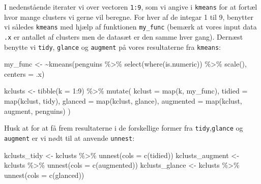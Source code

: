 \documentclass[
]{book}
\newenvironment{Shaded}{\begin{snugshade}}{\end{snugshade}}
\newcommand{\AttributeTok}[1]{\textcolor[rgb]{0.77,0.63,0.00}{#1}}
\newcommand{\DecValTok}[1]{\textcolor[rgb]{0.00,0.00,0.81}{#1}}
\newcommand{\ErrorTok}[1]{\textcolor[rgb]{0.64,0.00,0.00}{\textbf{#1}}}
\newcommand{\FunctionTok}[1]{\textcolor[rgb]{0.00,0.00,0.00}{#1}}
\newcommand{\NormalTok}[1]{#1}
\newcommand{\OtherTok}[1]{\textcolor[rgb]{0.56,0.35,0.01}{#1}}
\newcommand{\SpecialCharTok}[1]{\textcolor[rgb]{0.00,0.00,0.00}{#1}}
\begin{document}
I nedenstående iterater vi over vectoren \texttt{1:9}, som vi angive i \texttt{kmeans} for at fortæl hvor mange clusters vi gerne vil beregne. For hver af de integar 1 til 9, benytter vi således \texttt{kmeans} med hjælp af funktionen \texttt{my\_func} (bemærk at vores input data \texttt{.x} er antallet af clusters men de datasæt er den samme hver gang). Dernæst benytte vi \texttt{tidy}, \texttt{glance} og \texttt{augment} på vores resultaterne fra \texttt{kmeans}:

\begin{Shaded}
\begin{Highlighting}[]
\NormalTok{my\_func }\OtherTok{\textless{}{-}} \ErrorTok{\textasciitilde{}}\FunctionTok{kmeans}\NormalTok{(penguins }\SpecialCharTok{\%\textgreater{}\%} \FunctionTok{select}\NormalTok{(}\FunctionTok{where}\NormalTok{(is.numeric)) }\SpecialCharTok{\%\textgreater{}\%} \FunctionTok{scale}\NormalTok{(),}
                 \AttributeTok{centers =}\NormalTok{ .x)  }

\NormalTok{kclusts }\OtherTok{\textless{}{-}} 
  \FunctionTok{tibble}\NormalTok{(}\AttributeTok{k =} \DecValTok{1}\SpecialCharTok{:}\DecValTok{9}\NormalTok{) }\SpecialCharTok{\%\textgreater{}\%}
  \FunctionTok{mutate}\NormalTok{( }\AttributeTok{kclust =} \FunctionTok{map}\NormalTok{(k, my\_func),}
          \AttributeTok{tidied =} \FunctionTok{map}\NormalTok{(kclust, tidy),}
          \AttributeTok{glanced =} \FunctionTok{map}\NormalTok{(kclust, glance),}
          \AttributeTok{augmented =} \FunctionTok{map}\NormalTok{(kclust, augment, penguins)}
\NormalTok{        )}
\end{Highlighting}
\end{Shaded}

Husk at for at få frem resultaterne i de forskellige former fra \texttt{tidy},\texttt{glance} og \texttt{augment} er vi nødt til at anvende \texttt{unnest}:

\begin{Shaded}
\begin{Highlighting}[]
\NormalTok{kclusts\_tidy    }\OtherTok{\textless{}{-}}\NormalTok{ kclusts }\SpecialCharTok{\%\textgreater{}\%} \FunctionTok{unnest}\NormalTok{(}\AttributeTok{cols =} \FunctionTok{c}\NormalTok{(tidied))}
\NormalTok{kclusts\_augment }\OtherTok{\textless{}{-}}\NormalTok{ kclusts }\SpecialCharTok{\%\textgreater{}\%} \FunctionTok{unnest}\NormalTok{(}\AttributeTok{cols =} \FunctionTok{c}\NormalTok{(augmented))}
\NormalTok{kclusts\_glance }\OtherTok{\textless{}{-}}\NormalTok{ kclusts }\SpecialCharTok{\%\textgreater{}\%} \FunctionTok{unnest}\NormalTok{(}\AttributeTok{cols =} \FunctionTok{c}\NormalTok{(glanced))}
\end{Highlighting}
\end{Shaded}
\end{document}
